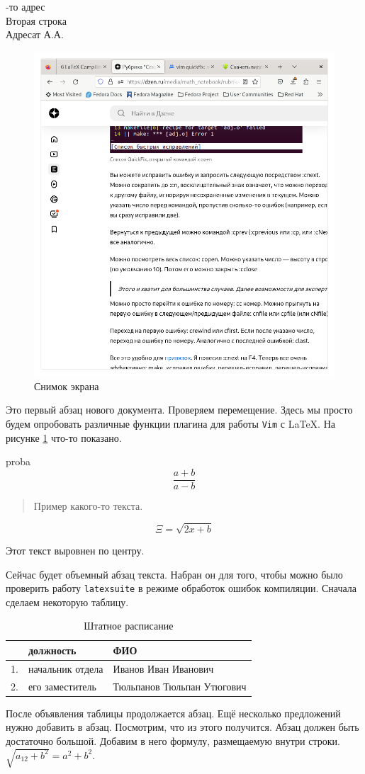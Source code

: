 \documentclass[a4paper]{article}
\begin{document}
\hfill
\parbox{75mm}{-то адрес\\Вторая строка\\[3mm]Адресат А.А.}
	
\begin{figure}[t]
	\centering
	\includegraphics[width=.7\textwidth]{screenshot-firefox.png}
	\caption{Снимок экрана}
	\label{fig:screenshot}
\end{figure}

Это первый абзац нового документа. Проверяем перемещение. Здесь мы просто будем опробовать различные функции 
плагина для работы \texttt{Vim} с \LaTeX.
На рисунке \ref{fig:screenshot} что-то показано. 

proba 
$$\frac{a+b}{a-b}$$
\begin{quote}
  Пример какого-то текста.
\end{quote}
\begin{equation}
   \Xi = \sqrt{2x+b} 
  \label{equation}
\end{equation}
\begin{center}
	Этот текст выровнен по центру.
\end{center}
Сейчас будет объемный абзац текста. Набран он для того, чтобы можно было проверить работу
\texttt{latexsuite} в режиме обработок ошибок компиляции. Сначала сделаем некоторую таблицу.
\begin{table}
	\centering
	\begin{tabular}{|c|l|p{3cm}|}
		\hline
		\textnumero&должность&ФИО\\
		\hline
		1.&начальник отдела&Иванов Иван Иванович\\
		2.&его заместитель&Тюльпанов Тюльпан Утюгович\\
		\hline
	\end{tabular}
	\caption{Штатное расписание}
	\label{tab:state-department}
\end{table}
После объявления таблицы продолжается абзац. Ещё несколько предложений нужно добавить в абзац.
Посмотрим, что из этого получится. Абзац должен быть достаточно большой. Добавим в него формулу, 
размещаемую внутри строки. $\sqrt{a_{12}+b^2} = a^2+b^2$.
\end{document}
